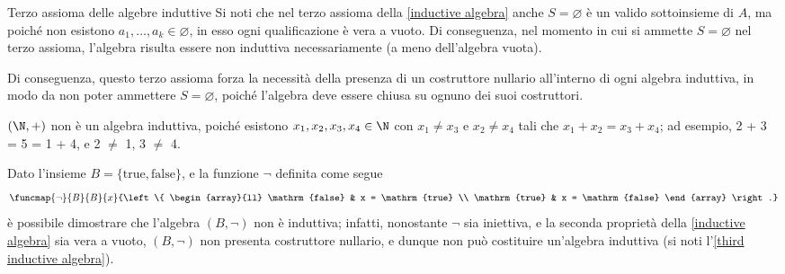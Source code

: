 \documentclass[a4paper, 12pt]{report}
\begin{document}
    \begin{framedobs}[label={third inductive algebra}]{Terzo assioma delle algebre induttive}
        Si noti che nel terzo assioma della \cref{inductive algebra} anche $S = \varnothing$ è un valido sottoinsieme di $A$, ma poiché non esistono $a_1, \ldots, a_k \in \varnothing$, in esso ogni qualificazione è vera a vuoto. Di conseguenza, nel momento in cui si ammette $S = \varnothing$ nel terzo assioma, l'algebra risulta essere non induttiva necessariamente (a meno dell'algebra vuota).
        
        Di conseguenza, questo terzo assioma forza la necessità della presenza di un costruttore nullario all'interno di ogni algebra induttiva, in modo da non poter ammettere $S = \varnothing$, poiché l'algebra deve essere chiusa su ognuno dei suoi costruttori.
    \end{framedobs}

    \begin{example}
        $(\N, +)$ non è un algebra induttiva, poiché esistono $x_1, x_2, x_3, x_4 \in \N$ con $x_1 \neq x_3$ e $x_2 \neq x_4$ tali che $x_1 + x_2 = x_3 + x_4$; ad esempio, 2 + 3 = 5 = 1 + 4, e 2 $\neq$ 1, 3 $\neq$ 4.
    \end{example}

    \begin{example}
        Dato l'insieme $B = \{ \mathrm{true}, \mathrm{false}\}$, e la funzione $\lnot$ definita come segue $$\funcmap{\lnot}{B}{B}{x}{\left \{ \begin{array}{ll} \mathrm{false} & x = \mathrm{true} \\ \mathrm{true} & x = \mathrm{false} \end{array} \right.}$$ è possibile dimostrare che l'algebra $(B, \lnot)$ non è induttiva; infatti, nonostante $\lnot$ sia iniettiva, e la seconda proprietà della \cref{inductive algebra} sia vera a vuoto, $(B, \lnot)$ non presenta costruttore nullario, e dunque non può costituire un'algebra induttiva (si noti l'\cref{third inductive algebra}).
    \end{example}
\end{document}
